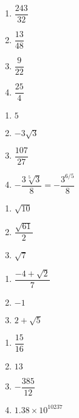 \documentclass{ximera}
\begin{document}
\begin{multicols}{4}
\begin{enumerate}
\setcounter{enumi}{\value{HW}}

\item  $\dfrac{243}{32}$
\item  $\dfrac{13}{48}$
\item  $\dfrac{9}{22}$
\item  $\dfrac{25}{4}$

\setcounter{HW}{\value{enumi}}
\end{enumerate}
\end{multicols}

\begin{multicols}{4}
\begin{enumerate}
\setcounter{enumi}{\value{HW}}

\item  $5$ 
\item  $-3\sqrt{3}$ 
\item  $\dfrac{107}{27}$
\item  $-\dfrac{3\sqrt[5]{3}}{8} = -\dfrac{3^{6/5}}{8}$

\setcounter{HW}{\value{enumi}}
\end{enumerate}
\end{multicols}


\begin{multicols}{3}
\begin{enumerate}
\setcounter{enumi}{\value{HW}}

\item  $\sqrt{10}$
\item  $\dfrac{\sqrt{61}}{2}$ 
\item  $\sqrt{7}$

\setcounter{HW}{\value{enumi}}
\end{enumerate}
\end{multicols}

\begin{multicols}{3}
\begin{enumerate}
\setcounter{enumi}{\value{HW}}

\item  $\dfrac{-4 + \sqrt{2}}{7}$
\item  $-1$
\item  $2 + \sqrt{5}$

\setcounter{HW}{\value{enumi}}
\end{enumerate}
\end{multicols}

\begin{multicols}{4}
\begin{enumerate}
\setcounter{enumi}{\value{HW}}

\item $\dfrac{15}{16}$
\item $13$
\item $-\dfrac{385}{12}$

\item $1.38 \times 10^{10237}$
\end{enumerate}
\end{multicols}
\end{document}
